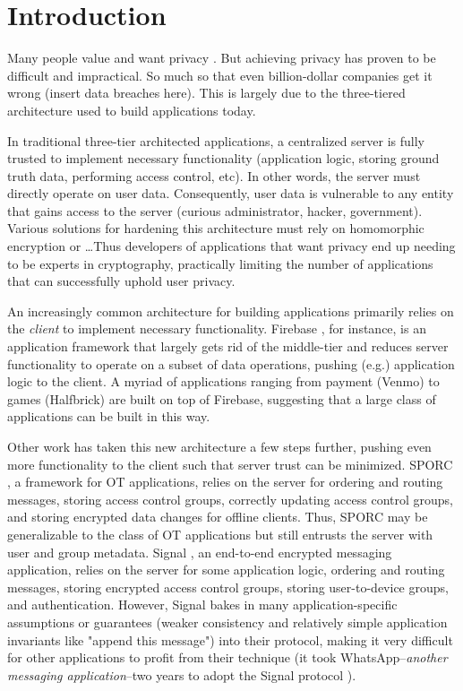 \section{Introduction}

Many people value and want privacy \cite{}. But achieving privacy has proven to 
be difficult and impractical. So much so that even billion-dollar companies get 
it wrong (insert data breaches here). This is largely due to the three-tiered 
architecture used to build applications today. 

In traditional three-tier architected applications, a centralized server 
is fully trusted to implement necessary functionality (application logic, 
storing ground truth data, performing access control, etc). In other words, the 
server must directly operate on user data. Consequently, user data is 
vulnerable to any entity that gains access to the server (curious administrator, 
hacker, government). Various solutions for hardening this architecture must rely 
on homomorphic encryption \cite{cryptdb} or \dots Thus developers of 
applications that want privacy end up needing to be experts in cryptography, 
practically limiting the number of applications that can successfully uphold 
user privacy.

An increasingly common architecture for building applications primarily relies 
on the \textit{client} to implement necessary functionality. Firebase 
\cite{firebase}, for instance, is an application framework that largely gets 
rid of the middle-tier and reduces server functionality to operate on a subset 
of data operations, pushing (e.g.) application logic to the client. A myriad of 
applications ranging from payment (Venmo) to games (Halfbrick) are built on top 
of Firebase, suggesting that a large class of applications can be built in this 
way. 

Other work has taken this new architecture a few steps further, pushing even 
more functionality to the client such that server trust can be minimized. 
SPORC \cite{sporc}, a framework for OT applications, relies on the server 
for ordering and routing messages, storing access control groups, correctly 
updating access control groups, and storing encrypted data changes for offline
clients. Thus, SPORC may be generalizable to the class of OT applications but 
still entrusts the server with user and group metadata. Signal \cite{signal}, 
an end-to-end encrypted messaging application, relies on the server for some 
application logic, ordering and routing messages, storing encrypted access 
control groups, storing user-to-device groups, and authentication. However, 
Signal bakes in many application-specific assumptions or guarantees
(weaker consistency and relatively simple application invariants like "append 
this message") into their protocol, making it very difficult for other 
applications to profit from their technique (it took WhatsApp\---\textit{another
messaging application}\---two years to adopt the Signal protocol 
\cite{whatsapp_adopts_signal}).

